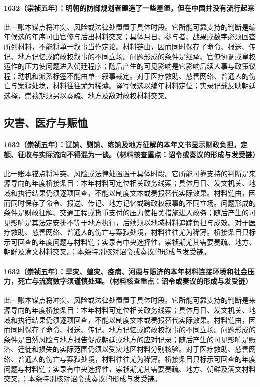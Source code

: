 \paragraph{1632（崇祯五年）：明朝的防御规划者建造了一些星堡，但在中国并没有流行起来} 此一账本锚点将冲突、风险或法律处置置于具体时段。它所能可靠支持的判断是编年候选的年序可由官修与后出材料交叉；具体月日、参与者、战果或数字必须回查所列材料，不能将单一叙事当作定论。材料链由，因而同时保存了命令、报送、传记、地方记忆或跨政权叙事的不同立场。问题形成的条件是继承、官僚协调或皇权运作的压力使问题进入朝廷程序；随后产生的可见影响是它影响后续人事与政策议程；动机和派系标签不能由单一叙事裁定。对于医疗救助、慈善网络、普通人的伤亡与案狱处境，材料往往尤为稀薄。译写候选以编年材料定位；实录记载反映朝廷选择，崇祯期须另以奏疏、地方及敌对政权材料交叉。

\subsection{灾害、医疗与赈恤}

\paragraph{1632（崇祯五年）：辽饷、剿饷、练饷及地方征解的本年文书显示财政负担，定额、征收与实际流向不得混为一谈。（材料核查重点：诏令或奏议的形成与发受链）} 此一账本锚点将冲突、风险或法律处置置于具体时段。它所能可靠支持的判断是来源导向的年度桥接条目：本年材料可定位相关政务线索；具体月日、发文机关、地域和执行结果仍须逐项回查，不能以制度文本或奏报替代实际效果。材料链由，因而同时保存了命令、报送、传记、地方记忆或跨政权叙事的不同立场。问题形成的条件是财政征解、交通工程或货币支付的压力使相关措施进入政务；随后产生的可见影响是其法定安排不等于地方执行，后续须以地域材料追踪负担与成效。对于医疗救助、慈善网络、普通人的伤亡与案狱处境，材料往往尤为稀薄。桥接条目只标示可回查的年度问题与材料链；实录有中央选择性，崇祯期尤其需要奏疏、地方、朝鲜及满文材料交叉。；本条特别核对诏令或奏议的形成与发受链。

\paragraph{1632（崇祯五年）：旱灾、蝗灾、疫病、河患与赈济的本年材料连接环境和社会压力，死亡与流离数字须谨慎处理。（材料核查重点：诏令或奏议的形成与发受链）} 此一账本锚点将冲突、风险或法律处置置于具体时段。它所能可靠支持的判断是来源导向的年度桥接条目：本年材料可定位相关政务线索；具体月日、发文机关、地域和执行结果仍须逐项回查，不能以制度文本或奏报替代实际效果。材料链由，因而同时保存了命令、报送、传记、地方记忆或跨政权叙事的不同立场。问题形成的条件是自然风险与地方报告促成朝廷或地方的应对记录；随后产生的可见影响是赈济、迁徙和损失的实际范围仍须以受灾地区材料分别核验。对于医疗救助、慈善网络、普通人的伤亡与案狱处境，材料往往尤为稀薄。桥接条目只标示可回查的年度问题与材料链；实录有中央选择性，崇祯期尤其需要奏疏、地方、朝鲜及满文材料交叉。；本条特别核对诏令或奏议的形成与发受链。

